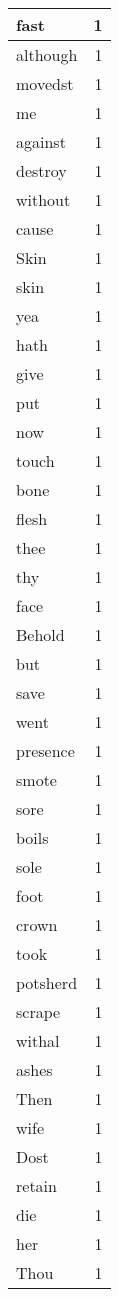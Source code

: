 \begin{center}
\begin{longtable}{l|r}
fast & 1\\ \hline 
although & 1\\ \hline 
movedst & 1\\ \hline 
me & 1\\ \hline 
against & 1\\ \hline 
destroy & 1\\ \hline 
without & 1\\ \hline 
cause & 1\\ \hline 
Skin & 1\\ \hline 
skin & 1\\ \hline 
yea & 1\\ \hline 
hath & 1\\ \hline 
give & 1\\ \hline 
put & 1\\ \hline 
now & 1\\ \hline 
touch & 1\\ \hline 
bone & 1\\ \hline 
flesh & 1\\ \hline 
thee & 1\\ \hline 
thy & 1\\ \hline 
face & 1\\ \hline 
Behold & 1\\ \hline 
but & 1\\ \hline 
save & 1\\ \hline 
went & 1\\ \hline 
presence & 1\\ \hline 
smote & 1\\ \hline 
sore & 1\\ \hline 
boils & 1\\ \hline 
sole & 1\\ \hline 
foot & 1\\ \hline 
crown & 1\\ \hline 
took & 1\\ \hline 
potsherd & 1\\ \hline 
scrape & 1\\ \hline 
withal & 1\\ \hline 
ashes & 1\\ \hline 
Then & 1\\ \hline 
wife & 1\\ \hline 
Dost & 1\\ \hline 
retain & 1\\ \hline 
die & 1\\ \hline 
her & 1\\ \hline 
Thou & 1\\ \hline 

\end{longtable}
\end{center}
